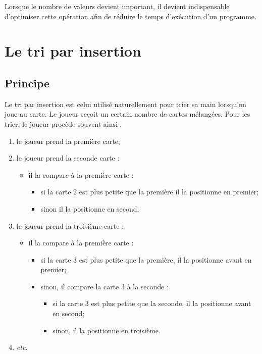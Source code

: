 \documentclass[11pt,oneside]{article}
\begin{document}
Lorsque le nombre de valeurs devient important, il devient indispensable d'optimiser cette opération afin de réduire le temps d'exécution d'un programme. 

\section{Le tri par insertion}
\setcounter{paragraph}{0}
\subsection{Principe}
Le tri par insertion est celui utilisé naturellement pour trier sa main lorsqu'on joue au carte. Le joueur reçoit un certain nombre de cartes mélangées. Pour les trier, le joueur procède souvent ainsi :
\begin{enumerate}
\item le joueur prend la première carte;
\item le joueur prend la seconde carte :
\begin{itemize}
\item il la compare à la première carte :
\begin{itemize}
\item si la carte 2 est plus petite que la première il la positionne en premier;
\item sinon il la positionne en second;
\end{itemize}
\end{itemize}
\item le joueur prend la troisième carte :
\begin{itemize}
\item il la compare à la première carte :
\begin{itemize}
\item si la carte 3 est plus petite que la première, il la positionne avant en premier;
\item sinon, il compare la carte 3 à la seconde :
\begin{itemize}
\item si la carte 3 est plus petite que la seconde, il la positionne avant en second;
\item sinon, il la positionne en troisième.
\end{itemize}
\end{itemize}
\end{itemize}
\item \textit{etc.}
\end{enumerate}
\end{document}
